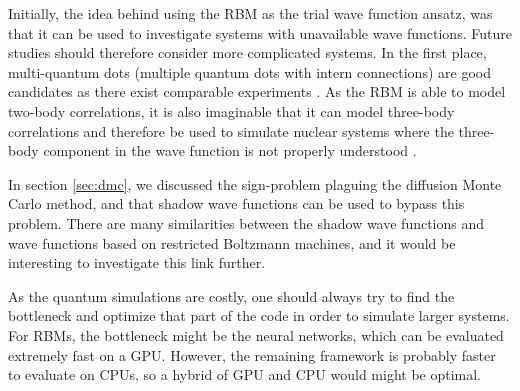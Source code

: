 Initially, the idea behind using the RBM as the trial wave function ansatz, was that it can be used to investigate systems with unavailable wave functions. Future studies should therefore consider more complicated systems. In the first place, multi-quantum dots (multiple quantum dots with intern connections) are good candidates as there exist comparable experiments \supercite{marzin_photoluminescence_1994,brunner_sharp-line_1994}. As the RBM is able to model two-body correlations, it is also imaginable that it can model three-body correlations and therefore be used to simulate nuclear systems where the three-body component in the wave function is not properly understood \supercite{sauer_three-nucleon_2014}.

In section \ref{sec:dmc}, we discussed the sign-problem plaguing the diffusion Monte Carlo method, and that shadow wave functions can be used to bypass this problem. There are many similarities between the shadow wave functions and wave functions based on restricted Boltzmann machines, and it would be interesting to investigate this link further.

As the quantum simulations are costly, one should always try to find the bottleneck and optimize that part of the code in order to simulate larger systems. For RBMs, the bottleneck might be the neural networks, which can be evaluated extremely fast on a GPU. However, the remaining framework is probably faster to evaluate on CPUs, so a hybrid of GPU and CPU would might be optimal.
